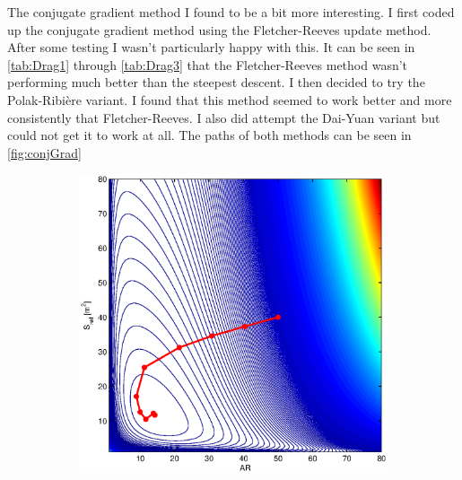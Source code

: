 \documentclass[12pt,parskip=full]{article}
\numberwithin{subsection}{section}
\begin{document}
		The conjugate gradient method I found to be a bit more interesting. I first coded up the conjugate gradient method
		using the Fletcher-Reeves update method. After some testing I wasn't particularly happy with this. It can be
		seen in \cref{tab:Drag1} through \cref{tab:Drag3} that the Fletcher-Reeves method wasn't performing much better
		than the steepest descent. I then decided to try the Polak-Ribi\`{e}re variant. I found that this method seemed
		to work better and more consistently that Fletcher-Reeves. I also did attempt the Dai-Yuan variant but could not
		get it to work at all. The paths of both methods can be seen in \cref{fig:conjGrad}
		\begin{figure}[!ht]
			\centering
			\begin{subfigure}[h]{0.4\textwidth}
				\includegraphics[width=\textwidth]{ConjGradFRDrag3.eps}
			\end{subfigure}
			\begin{subfigure}[h]{0.4\textwidth}

\end{subfigure}
\end{figure}
\end{document}
